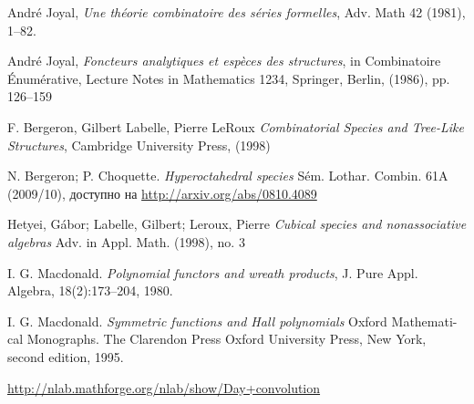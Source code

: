 \begin{thebibliography}{9}

 André Joyal, \emph{Une théorie combinatoire des séries
formelles}, Adv. Math 42 (1981), 1–82.

 André Joyal, \emph{Foncteurs analytiques et espèces des
structures}, in Combinatoire Énumérative, Lecture Notes in Mathematics 1234, Springer,
Berlin, (1986), pp. 126–159

 F. Bergeron, Gilbert Labelle, Pierre LeRoux
\emph{Combinatorial Species and Tree-Like Structures}, Cambridge University Press, (1998)

 N. Bergeron; P. Choquette.
\emph{Hyperoctahedral species} Sém. Lothar. Combin. 61A (2009/10), доступно на
\url{http://arxiv.org/abs/0810.4089}

 Hetyei, Gábor; Labelle, Gilbert;
Leroux, Pierre \emph{Cubical species and nonassociative algebras} Adv. in Appl.
Math. (1998), no. 3

 I. G. Macdonald. \emph{Polynomial functors and wreath
products}, J. Pure Appl. Algebra, 18(2):173–204, 1980.

 I. G. Macdonald. \emph{Symmetric functions and Hall polynomials}
Oxford Mathemati- cal Monographs.
The Clarendon Press Oxford University Press, New York, second edition, 1995.

 \url{http://nlab.mathforge.org/nlab/show/Day+convolution}

\end{thebibliography}